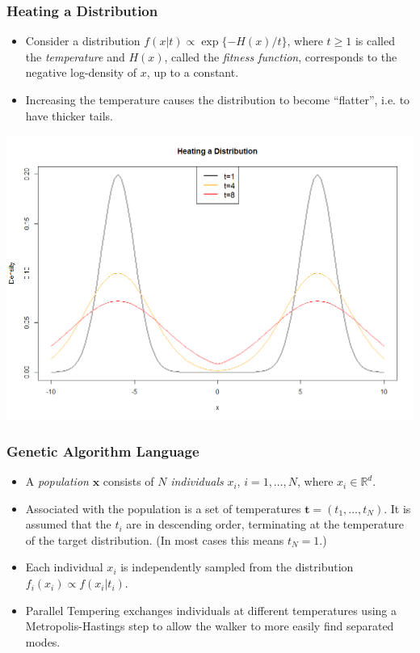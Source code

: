 \documentclass{beamer}\usepackage[]{graphicx}\usepackage[]{color}
\newcommand{\bt}{\mathbf t}
\begin{document}
\begin{frame}
  \frametitle{Heating a Distribution}
  \begin{itemize}
  \item Consider a distribution $f(x|t) \propto \exp\{
    -H(x)/t \}$, where $t\ge 1$ is called the \emph{temperature} and
    $H(x)$, called the \emph{fitness function}, corresponds to the
    negative log-density of $x$, up to a constant.
  \item Increasing the temperature causes the distribution to become
    ``flatter'', i.e. to have thicker tails.
  \end{itemize}
\end{frame}

\begin{frame}
  \begin{center}
  \includegraphics[scale=0.305]{figure/heat.png}    
  \end{center}
\end{frame}

\begin{frame}
  \frametitle{Genetic Algorithm Language}
  \begin{itemize}
  \item A \emph{population} $\mathbf{x}$ consists of $N$
    \emph{individuals} $x_i$, $i = 1, \ldots, N$, where $x_i \in
    \mathbb{R}^d$.
  \item Associated with the population is a set of temperatures $\bt
    = (t_1,\ldots,t_N)$. It is assumed that the $t_i$ are in
    descending order, terminating at the temperature of the target
    distribution. (In most cases this means $t_N =1$.)
  \item Each individual $x_i$ is independently sampled from the
    distribution $f_i(x_i) \propto f(x_i|t_i)$.
  \item Parallel Tempering exchanges individuals at different temperatures using a Metropolis-Hastings step to allow the walker to more easily find separated modes.
  \end{itemize}
\end{frame}
\end{document}
